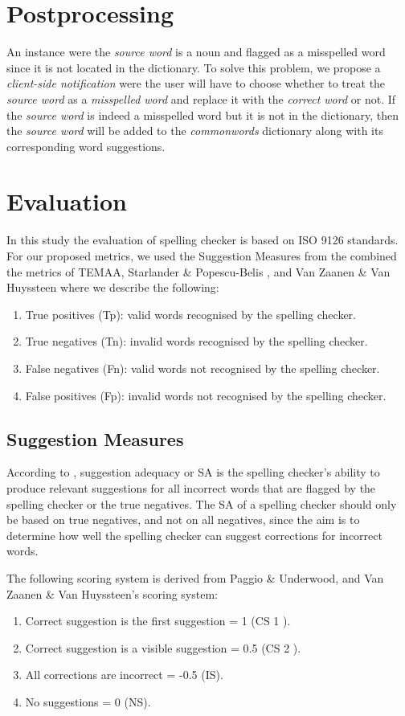 \documentclass[12pt]{book}
\begin{document}
\section{Postprocessing}
An instance were the \textit{source word} is a noun and flagged as a misspelled word since it is not located in the dictionary. To solve this problem, we propose a \textit{client-side notification} were the user will have to choose whether to treat the \textit{source word} as a \textit{misspelled word} and replace it with the \textit{correct word} or not. If the \textit{source word} is indeed a misspelled word but it is not in the dictionary, then the \textit{source word} will be added to the \textit{commonwords} dictionary along with its corresponding word suggestions.

\section{Evaluation}
In this study the evaluation of spelling checker is based on ISO 9126 standards. For our proposed metrics, we used the Suggestion Measures from the combined the metrics of TEMAA, Starlander \& Popescu-Belis , and Van Zaanen \& Van Huyssteen where we describe the following:

\begin{enumerate}
\item True positives (Tp): valid words recognised by the spelling checker.
\item True negatives (Tn): invalid words recognised by the spelling checker.
\item False negatives (Fn): valid words not recognised by the spelling checker.
\item False positives (Fp): invalid words not recognised by the spelling checker.
\end{enumerate}

\subsection{Suggestion Measures}
According to \cite{van2004re}, suggestion adequacy or SA is the spelling checker's ability to produce relevant suggestions for all incorrect words that are flagged by the spelling checker or the true negatives. The SA of a spelling checker should only be based on true negatives, and not on all negatives, since the aim is to determine how well the spelling checker can suggest corrections for incorrect words.

The following scoring system is derived from Paggio \& Underwood, and Van Zaanen \& Van Huyssteen’s scoring system:
\begin{enumerate}
\item Correct suggestion is the first suggestion = 1 (CS 1 ).
\item Correct suggestion is a visible suggestion = 0.5 (CS 2 ).
\item All corrections are incorrect = -0.5 (IS).
\item No suggestions = 0 (NS).
\end{enumerate}
\end{document}
